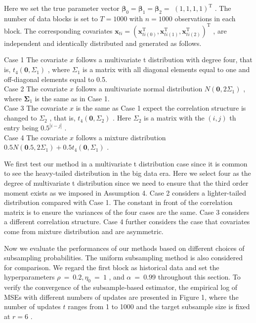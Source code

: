 \documentclass[
  10
]{article}
\begin{document}
Here we set the true parameter vector
\(\pmb { \beta } _ { 0 } = \pmb { \beta } _ { 1 } = \pmb { \beta } _ { 2 } =\)
\(( 1 , 1 , 1 , 1 ) ^ { \mathrm { T } }\) . The number of data blocks is
set to \(T = 1 0 0 0\) with \(n = 1 0 0 0\) observations in each block.
The corresponding covariates
\(\pmb { x } _ { t i } = ( \pmb { x } _ { t i ( 0 ) } ^ { \mathrm { T } } , \pmb { x } _ { t i ( 1 ) } ^ { \mathrm { T } } , \pmb { x } _ { t i ( 2 ) } ^ { \mathrm { T } } ) ^ { \mathrm { T } }\)
, are independent and identically distributed and generated as follows.

Case 1 The covariate \(x\) follows a multivariate t distribution with
degree four, that is, \(t _ { 4 } ( \mathbf { 0 } , \Sigma _ { 1 } )\) ,
where \(\Sigma _ { 1 }\) is a matrix with all diagonal elements equal to
one and off-diagonal elements equal to 0.5.\\
Case 2 The covariate \(x\) follows a multivariate normal distribution
\(N ( \mathbf { 0 } , 2 \Sigma _ { 1 } )\) , where
\({ \boldsymbol { \Sigma } } _ { 1 }\) is the same as in Case 1.\\
Case 3 The covariate \(x\) is the same as Case 1 expect the correlation
structure is changed to \(\Sigma _ { 2 }\) , that is,
\(t _ { 4 } ( \mathbf { 0 } , \Sigma _ { 2 } )\) . Here
\(\Sigma _ { 2 }\) is a matrix with the \(( i , j )\) th entry being
\(0 . 5 ^ { | i - j | }\) .\\
Case 4 The covariate \(x\) follows a mixture distribution
\(0 . 5 N ( \mathbf { 0 } . 5 , 2 \Sigma _ { 1 } ) + 0 . 5 t _ { 4 } ( \mathbf { 0 } , \Sigma _ { 1 } )\)
.

We first test our method in a multivariate t distribution case since it
is common to see the heavy-tailed distribution in the big data era. Here
we select four as the degree of multivariate t distribution since we
need to ensure that the third order moment exists as we imposed in
Assumption 4. Case 2 considers a lighter-tailed distribution compared
with Case 1. The constant in front of the correlation matrix is to
ensure the variances of the four cases are the same. Case 3 considers a
different correlation structure. Case 4 further considers the case that
covariates come from mixture distribution and are asymmetric.

Now we evaluate the performances of our methods based on different
choices of subsampling probabilities. The uniform subsampling method is
also considered for comparison. We regard the first block as historical
data and set the hyperparameters
\(\rho ~ = ~ 0 . 2 , \eta _ { 0 } ~ = ~ 1\) , and
\(\alpha \ = \ 0 . 9 9\) throughout this section. To verify the
convergence of the subsample-based estimator, the empirical log of MSEs
with different numbers of updates are presented in Figure 1, where the
number of updates \(t\) ranges from 1 to 1000 and the target subsample
size is fixed at \(r = 6\) .
\end{document}
